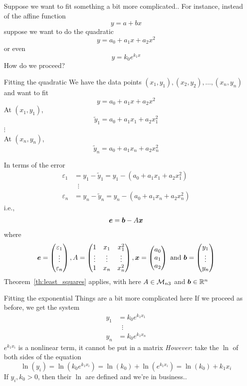 \documentclass[aspectratio=169]{beamer}
\begin{document}
\begin{frame}{Suppose we want to fit something a bit more complicated..}
For instance, instead of the affine function
\[
y = a+bx
\]
suppose we want to do the quadratic
\[
y = a_0+a_1x+a_2x^2
\]
or even
\[
y = k_0 e^{k_1x}
\]
\vfill
How do we proceed?
\end{frame}


\begin{frame}{Fitting the quadratic}
We have the data points $(x_1,y_1),(x_2,y_2),\ldots,(x_n,y_n)$ and want to fit
\[
y = a_0+a_1x+a_2x^2
\]
At $(x_1,y_1)$,
\[
\tilde y_1 = a_0+a_1x_1+a_2x_1^2
\]
$\vdots$\\
At $(x_n,y_n)$,
\[
\tilde y_n = a_0+a_1x_n+a_2x_n^2
\]
\end{frame}

\begin{frame}
In terms of the error
\begin{align*}
\varepsilon_1 &= y_1-\tilde y_1 = y_1-(a_0+a_1x_1+a_2x_1^2) \\
&\;\;\vdots\\
\varepsilon_n &= y_n-\tilde y_n = y_n-(a_0+a_1x_n+a_2x_n^2)
\end{align*}
i.e.,
\[
\bm{e} = \bm{b}-A\bm{x} 
\]
where
\[
\bm{e} = \begin{pmatrix}
\varepsilon_1\\ \vdots\\ \varepsilon_n
\end{pmatrix},
A=\begin{pmatrix}
1 & x_1 & x_1^2\\ \vdots & \vdots & \vdots \\ 1 & x_n & x_n^2
\end{pmatrix},
\bm{x} = \begin{pmatrix}
a_0\\a_1\\a_2
\end{pmatrix}\textrm{ and }
\bm{b} = \begin{pmatrix}
y_1\\ \vdots\\ y_n
\end{pmatrix}
\]
\vfill
Theorem~\ref{th:least_squares} applies, with here $A\in\mathcal{M}_{n3}$ and $\bm{b}\in\mathbb{R}^n$
\end{frame}


\begin{frame}{Fitting the exponential}
Things are a bit more complicated here
\vfill
If we proceed as before, we get the system
\begin{align*}
y_1 &= k_0 e^{k_1x_1} \\
&\;\;\vdots \\
y_n &= k_0 e^{k_1x_n}
\end{align*}
$e^{k_1x_i}$ is a nonlinear term, it cannot be put in a matrix
\vfill
\emph{However}: take the $\ln$ of both sides of the equation
\[
\ln(y_i) = \ln(k_0e^{k_1x_i}) = \ln(k_0)+\ln(e^{k_1x_i}) = \ln(k_0)+k_1x_i
\]
If $y_i,k_0>0$, then their $\ln$ are defined and we're in business..
\end{frame}
\end{document}
